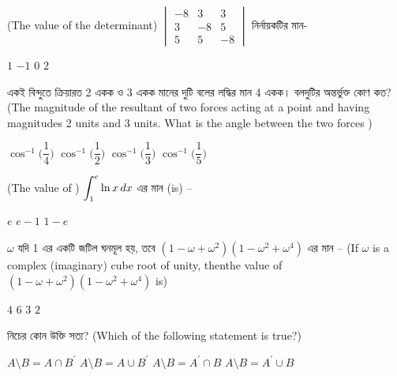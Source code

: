 \documentclass[addpoints]{exam}
\begin{document}
\begin{questions}
\begin{oneparchoices}
 
\end{oneparchoices}

\question (The value of the determinant) $ \begin{vmatrix}
-8 & 3 & 3\\
3 & -8 & 5\\
5 & 5 & -8
\end{vmatrix} $ নির্নায়কটির মান- 

\begin{oneparchoices}
\choice $ 1 $
\choice $ -1 $
\choice $ 0 $
\choice $ 2 $
\end{oneparchoices}

\question একই বিন্দুতে ক্রিয়ারত 2 একক ও 3 একক মানের দুটি বলের লদ্ধির মান 4 একক। বলদুটির অন্তর্ভুক্ত কোণ কত? (The magnitude of the resultant of two forces acting at a point and having magnitudes 2 units and 3 units. What is the angle between the two forces )

\begin{oneparchoices}
\choice $ \cos^{-1}\Big(\dfrac{1}{4} \Big) $
\choice $ \cos^{-1}\Big(\dfrac{1}{2} \Big) $
\choice $ \cos^{-1}\Big(\dfrac{1}{3} \Big) $
\choice $ \cos^{-1}\Big(\dfrac{1}{5} \Big) $
\end{oneparchoices}

\question  (The value of )  $ \mathlarger{\int_{1}^{e}\ln x\, dx} $ এর  মান (is) – 

\begin{oneparchoices}
\choice  $ e $
\choice  $ e-1 $
\choice  $ 1-e $
\end{oneparchoices}

\question $ \omega $ যদি 1 এর একটি জটিল ঘনমূল হয়, তবে $ (1-\omega +\omega^{2})(1-\omega^{2}+\omega^{4}) $ এর মান – (If $ \omega $ is a complex (imaginary) cube root of unity, thenthe value of $ (1-\omega +\omega^{2})(1-\omega^{2}+\omega^{4}) $ is)
 
\begin{oneparchoices}
\choice $ 4 $
\choice $ 6 $
\choice $ 3 $
\choice $ 2 $
\end{oneparchoices}

\question  নিচের কোন উক্তি সত্য?  (Which of the following statement is true?)

\begin{oneparchoices}
\choice  $ A\setminus B = A\cap B^{\prime} $
\choice  $ A\setminus B = A\cup B^{\prime} $
\choice  $ A\setminus B = A^{\prime}\cap B $
\choice  $ A\setminus B = A^{\prime}\cup B $
\end{oneparchoices}


\end{questions}
\end{document}
